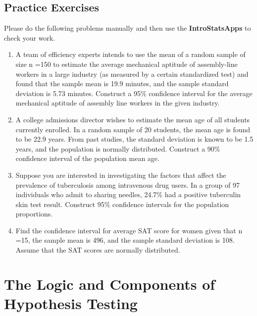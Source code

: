 \documentclass[
]{book}
\begin{document}
\hfill\break

\hfill\break

\hypertarget{practice-exercises-1}{%
\section{Practice Exercises}\label{practice-exercises-1}}

\hfill\break
Please do the following problems manually and then use the \textbf{IntroStatsApps} to check your work.

\hfill\break

\begin{enumerate}
\def\labelenumi{\arabic{enumi}.}
\item
  A team of efficiency experts intends to use the mean of a random sample of size n =150 to estimate the average mechanical aptitude of assembly-line workers in a large industry (as measured by a certain standardized test) and found that the sample mean is 19.9 minutes, and the sample standard deviation is 5.73 minutes. Construct a 95\% confidence interval for the average mechanical aptitude of assembly line workers in the given industry.
\item
  A college admissions director wishes to estimate the mean age of all students currently enrolled. In a random sample of 20 students, the mean age is found to be 22.9 years. From past studies, the standard deviation is known to be 1.5 years, and the population is normally distributed. Construct a 90\% confidence interval of the population mean age.
\item
  Suppose you are interested in investigating the factors that affect the prevalence of tuberculosis among intravenous drug users. In a group of 97 individuals who admit to sharing needles, 24.7\% had a positive tuberculin skin test result. Construct 95\% confidence intervals for the population proportions.
\item
  Find the confidence interval for average SAT score for women given that n =15, the sample mean is 496, and the sample standard deviation is 108. Assume that the SAT scores are normally distributed.
\end{enumerate}

\hypertarget{the-logic-and-components-of-hypothesis-testing}{%
\chapter{The Logic and Components of Hypothesis Testing}\label{the-logic-and-components-of-hypothesis-testing}}
\end{document}
